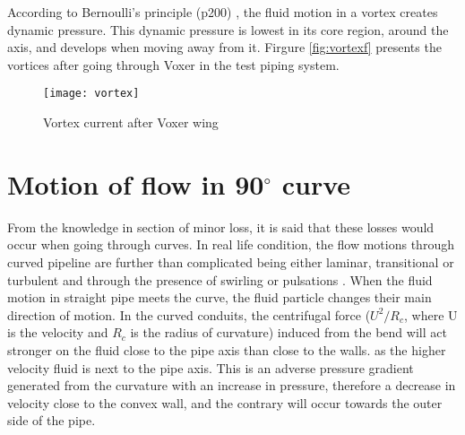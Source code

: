According to Bernoulli's principle (p200) \cite{cengel:book}, the fluid motion in a vortex creates dynamic pressure. This dynamic pressure is lowest in its core region, around the axis, and develops when moving away from it. Firgure \vref{fig:vortexf} presents the vortices after going through Voxer in the test piping system. 

\begin{figure}[h]
  \centering
  \texttt{[image: vortex]}
  \caption{Vortex current after Voxer wing}
  \label{fig:vortexf}
\end{figure}

\section{Motion of flow in 90$^{\circ}$ curve}
From the knowledge in section of minor loss, it is said that these losses would occur when going through curves. In real life condition, the flow motions through curved pipeline are further than complicated being either laminar, transitional or turbulent and through the presence of swirling or pulsations \cite{curve:article}.  When the fluid motion in straight pipe meets the curve, the fluid particle changes their main direction of motion. In the curved conduits, the centrifugal force ($U^{2} / R_{c}$, where U is the velocity and $R_{c}$ is the radius of curvature) induced from the bend will act stronger on the fluid close to the pipe axis than close to the walls. as the higher velocity fluid is next to the pipe axis. This is an adverse pressure gradient generated from the curvature with an increase in pressure, therefore a decrease in velocity close to the convex wall, and the contrary will occur towards the outer side of the pipe. 

\clearpage %
